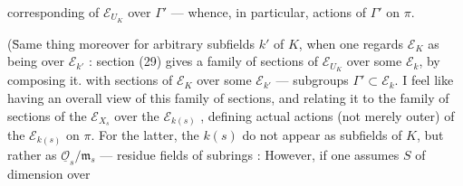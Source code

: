 corresponding of $\mathcal E_{U_K}$ over $\Gamma'$ --- whence, in particular, actions of $\Gamma'$ on $\pi$.

(\={Same} thing moreover for arbitrary subfields $k'$ of $K$, when one regards $\mathcal E_K$ as being over $\mathcal E_{k'}$ : section (29) gives a family of sections of $\mathcal E_{U_K}$ over some $\mathcal E_k$,  by composing it. with sections of $\mathcal E_K$ over some $\mathcal E_{k'}$ --- subgroups $\Gamma'\subset\mathcal E_k$. I feel like having an overall view of this family of sections, and relating it to the family of sections of the $\mathcal E_{X_s}$ over the $\mathcal E_{k(s)}$ , defining actual actions (not merely outer) of the $\mathcal E_{k(s)}$ on $\pi$. For the latter, the $k(s)$ do not appear as subfields of $K$, but rather as $\underline{\mathcal O}_s/\mathfrak m_s$ --- residue fields of subrings : However, if one assumes $S$ of dimension   over

